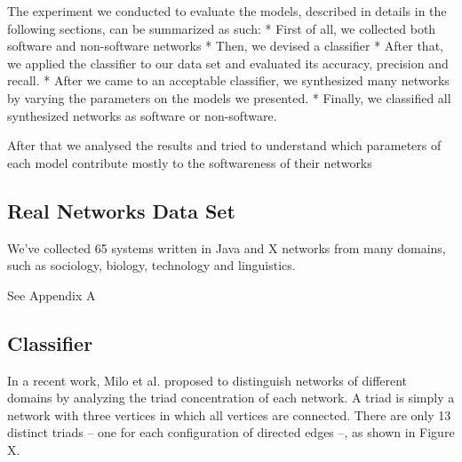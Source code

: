 The experiment we conducted to evaluate the models, described in details in the
following sections, can be summarized as such:
* First of all, we collected both software and non-software networks
* Then, we devised a classifier
* After that, we applied the classifier to our data set and evaluated its
accuracy, precision and recall.
* After we came to an acceptable classifier, we synthesized many networks by
varying the parameters on the models we presented.
* Finally, we classified all synthesized networks as software or non-software.

After that we analysed the results and tried to understand which parameters
of each model contribute mostly to the softwareness of their networks


\subsection{Real Networks Data Set}

We've collected 65 systems written in Java and X networks from many domains,
such as sociology, biology, technology and linguistics.

See Appendix A

\subsection{Classifier} %

In a recent work, Milo et al. proposed to distinguish networks of different
domains by analyzing the triad concentration of each network. A triad is simply
a network with three vertices in which all vertices are connected. There are
only 13 distinct triads -- one for each configuration of directed edges --, as
shown in Figure X.

